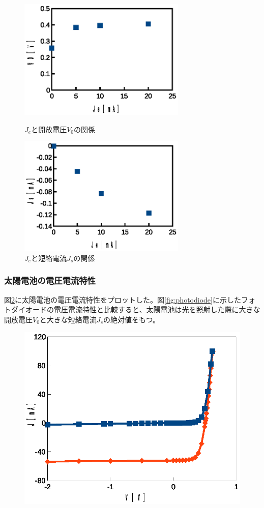 \documentclass[11pt,a4]{jarticle}
\begin{document}
\begin{figure}[htbp]
 \begin{minipage}{0.5\hsize}
  \begin{center}
   \includegraphics[width=80mm]{Je_V0.eps}
  \end{center}
  \caption{$J_e$と開放電圧$V_0$の関係}
  \label{fig:Je_V0}
 \end{minipage}
 \begin{minipage}{0.5\hsize}
  \begin{center}
   \includegraphics[width=80mm]{Je_Js.eps}
  \end{center}
  \caption{$J_e$と短絡電流$J_s$の関係}
  \label{fig:Je_Js}
 \end{minipage}
\end{figure}

\subsubsection{太陽電池の電圧電流特性}
図\ref{fig:solor_cell}に太陽電池の電圧電流特性をプロットした。図\ref{fig:photodiode}に示したフォトダイオードの電圧電流特性と比較すると、太陽電池は光を照射した際に大きな開放電圧$V_0$と大きな短絡電流$J_s$の絶対値をもつ。
 \begin{figure}[!htbp]
   \begin{center}
    \includegraphics[width=0.6\hsize]{./solor_cell.eps}
    \caption{}
     \label{fig:solor_cell}
   \end{center}
\end{figure}
\end{document}
